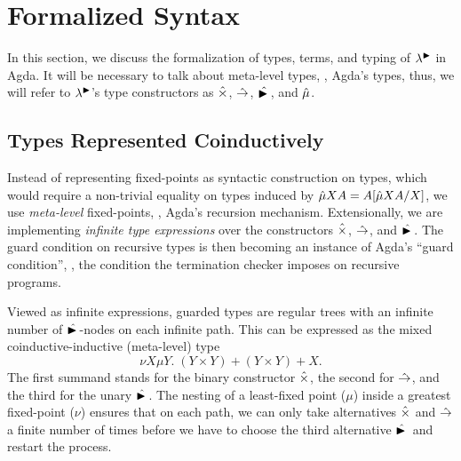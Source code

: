 
\section{Formalized Syntax}
\label{sec:syntax}

In this section, we discuss the formalization of types, terms, and
typing of $\lambda^{\mathord{\blacktriangleright}}$ in Agda.  It will be necessary to talk about
meta-level types, \ie, Agda's types, thus, we will refer to
$\lambda^{\mathord{\blacktriangleright}}$'s type constructors as $\hattimes$, $\hatto$,
$\hatlater$, and $\hatmu$.

\subsection{Types Represented Coinductively}

Instead of representing fixed-points as syntactic construction on
types, which would require a non-trivial equality on types induced by
$\hatmu X A = \subst{\hatmu X A}X A$, we use \emph{meta-level} fixed-points,
\ie, Agda's recursion mechanism.  Extensionally, we are implementing
\emph{infinite type expressions} over the constructors $\hattimes$,
$\hatto$, and $\hatlater$.  The guard condition on recursive types is then
becoming an instance of Agda's ``guard condition'', \ie, the condition
the termination checker imposes on recursive programs.

Viewed as infinite expressions, guarded types are regular trees with
an infinite number of $\hatlater$-nodes on each infinite path.  This
can be expressed as the mixed coinductive-inductive (meta-level) type
\[
  \nu X \mu Y.\; (Y \times Y) + (Y \times Y) + X. 
\]
The first summand stands for the binary constructor $\hattimes$, the
second for $\hatto$, and the third for the unary $\hatlater$.  The
nesting of a least-fixed point ($\mu$) inside a greatest fixed-point
($\nu$) ensures that on each path, we can only take alternatives
$\hattimes$ and $\hatto$ a finite number of times before we have to
choose the third alternative $\hatlater$ and restart the process.








